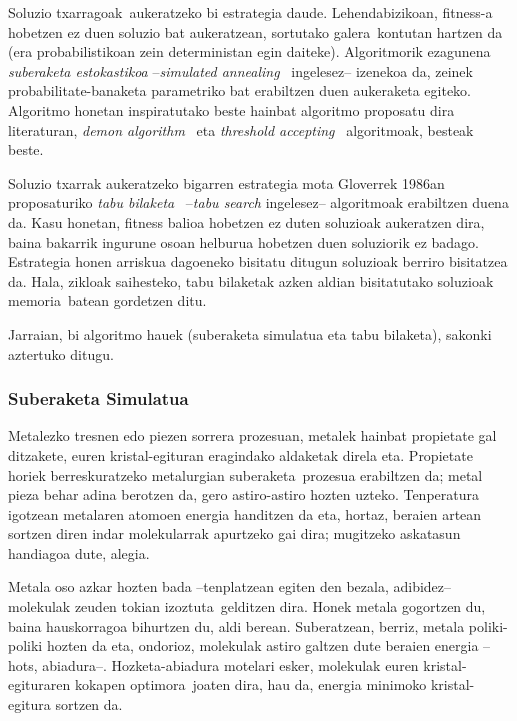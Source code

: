 \documentclass[eu]{ifirak}\usepackage[]{graphicx}\usepackage[]{color}
\newcommand{\zkk}{\guillemotleft}
\newcommand{\skk}{\guillemotright}
\begin{document}
Soluzio \zkk txarragoak\skk\ aukeratzeko bi estrategia daude. Lehendabizikoan, fitness-a hobetzen ez duen soluzio bat aukeratzean, sortutako \zkk galera\skk\ kontutan hartzen da (era probabilistikoan zein deterministan egin daiteke). Algoritmorik ezagunena \textit{suberaketa estokastikoa} --\textit{simulated annealing}~\cite{kirkpatrick1983,cerny1985} ingelesez-- izenekoa da, zeinek probabilitate-banaketa parametriko bat erabiltzen duen aukeraketa egiteko. Algoritmo honetan inspiratutako beste hainbat algoritmo proposatu dira literaturan, \textit{demon algorithm}~\cite{pepper2000} eta \textit{threshold accepting}~\cite{dueck1990,moscato1990} algoritmoak, besteak beste.

Soluzio txarrak aukeratzeko bigarren estrategia mota Gloverrek 1986an proposaturiko \textit{tabu bilaketa}~\cite{glover1986} --\textit{tabu search} ingelesez-- algoritmoak erabiltzen duena da. Kasu honetan, fitness balioa hobetzen ez duten soluzioak aukeratzen dira, baina bakarrik ingurune osoan helburua hobetzen duen soluziorik ez badago. Estrategia honen arriskua dagoeneko bisitatu ditugun soluzioak berriro bisitatzea da. Hala, zikloak saihesteko, tabu bilaketak azken aldian bisitatutako soluzioak  \zkk memoria\skk\ batean gordetzen ditu.

Jarraian, bi algoritmo hauek (suberaketa simulatua eta tabu bilaketa), sakonki aztertuko ditugu.

\subsubsection{Suberaketa Simulatua}

Metalezko tresnen edo piezen sorrera prozesuan, metalek hainbat propietate gal ditzakete, euren kristal-egituran eragindako aldaketak direla eta. Propietate horiek berreskuratzeko metalurgian \zkk suberaketa\skk\ prozesua erabiltzen da; metal pieza behar adina berotzen da, gero astiro-astiro hozten uzteko. Tenperatura igotzean metalaren atomoen energia handitzen da eta, hortaz, beraien artean sortzen diren indar molekularrak apurtzeko gai dira; mugitzeko askatasun handiagoa dute, alegia. 

Metala oso azkar hozten bada --tenplatzean egiten den bezala, adibidez-- molekulak zeuden tokian \zkk izoztuta\skk\ gelditzen dira. Honek metala gogortzen du, baina hauskorragoa bihurtzen du, aldi berean. Suberatzean, berriz, metala poliki-poliki hozten da eta, ondorioz, molekulak astiro galtzen dute beraien energia --hots, abiadura--. Hozketa-abiadura motelari esker, molekulak euren kristal-egituraren \zkk kokapen optimora\skk\ joaten dira, hau da, energia minimoko kristal-egitura sortzen da.
\end{document}
